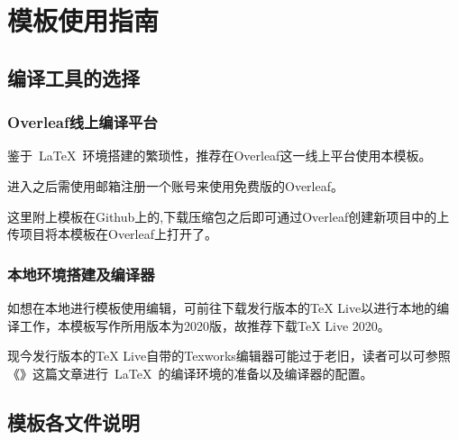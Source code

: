 \chapter{模板使用指南}

\section{编译工具的选择}

\subsection{Overleaf线上编译平台}

鉴于~\LaTeX~环境搭建的繁琐性，推荐在Overleaf这一线上平台使用本模板。

进入之后需使用邮箱注册一个账号来使用免费版的Overleaf。

这里附上模板在Github上的,下载压缩包之后即可通过Overleaf创建新项目中的上传项目将本模板在Overleaf上打开了。

\subsection{本地环境搭建及编译器}

如想在本地进行模板使用编辑，可前往下载发行版本的TeX Live以进行本地的编译工作，本模板写作所用版本为2020版，故推荐下载TeX Live 2020。

现今发行版本的TeX Live自带的Texworks编辑器可能过于老旧，读者可以可参照《》这篇文章进行~\LaTeX~的编译环境的准备以及编译器的配置。

\section{模板各文件说明}

